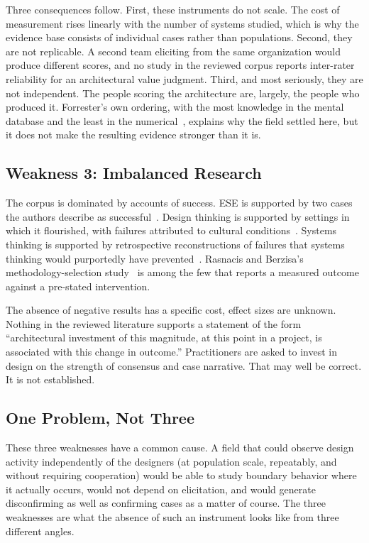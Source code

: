 \documentclass{csimq}
\begin{document}
Three consequences follow. First, these instruments do not scale. The
cost of measurement rises linearly with the number of systems studied, which is
why the evidence base consists of individual cases rather than populations.
Second, they are not replicable. A second team eliciting from the same
organization would produce different scores, and no study in the reviewed corpus
reports inter-rater reliability for an architectural value judgment. Third, and
most seriously, they are not independent. The people scoring the
architecture are, largely, the people who produced it.
Forrester's own ordering, with the most knowledge in the mental database and the least in
the numerical~\cite{forrester2009}, explains why the field settled here, but it
does not make the resulting evidence stronger than it is.

\subsection{Weakness 3: Imbalanced Research}

The corpus is dominated by accounts of success. ESE is supported by two cases
the authors describe as successful~\cite{kotze2016}. Design thinking is
supported by settings in which it flourished, with failures attributed to
cultural conditions~\cite{dunne2018}. Systems thinking is supported by
retrospective reconstructions of failures that systems thinking would
purportedly have prevented~\cite{monat2020}. Rasnacis and Berzisa's
methodology-selection study~\cite{rasnacis2017} is among the few that reports a
measured outcome against a pre-stated intervention.

The absence of negative results has a specific cost, effect sizes are
unknown. Nothing in the reviewed literature supports a statement of the form
``architectural investment of this magnitude, at this point in a project, is
associated with this change in outcome.'' Practitioners are asked to invest in
design on the strength of consensus and case narrative. That may well be
correct. It is not established.

\subsection{One Problem, Not Three}

These three weaknesses have a common cause. A field that could observe design
activity independently of the designers (at population scale, repeatably, and
without requiring cooperation) would be able to study boundary behavior where
it actually occurs, would not depend on elicitation, and would generate
disconfirming as well as confirming cases as a matter of course. The three
weaknesses are what the absence of such an instrument looks like from three
different angles.
\end{document}
